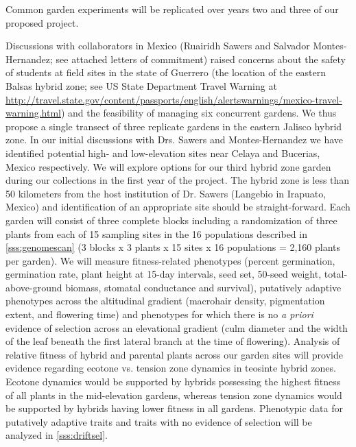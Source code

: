 Common garden experiments will be replicated over years two and three of our proposed project.  

Discussions with collaborators in Mexico (Ruairidh Sawers and Salvador Montes-Hernandez; see attached letters of commitment) raised concerns about the safety of students at field sites in the state of Guerrero (the location of the eastern Balsas hybrid zone; see US State Department Travel Warning at \url{http://travel.state.gov/content/passports/english/alertswarnings/mexico-travel-warning.html}) and the feasibility of managing six concurrent gardens. We thus propose a single transect of three replicate gardens in the eastern Jalisco hybrid zone. 
In our initial discussions with Drs. Sawers and Montes-Hernandez we have identified potential high- and low-elevation sites near Celaya and Bucerias, Mexico respectively.  
We will explore options for our third hybrid zone garden during our collections in the first year of the project.
The hybrid zone is less than 50 kilometers from the host institution of Dr. Sawers (Langebio in Irapuato, Mexico) and identification of an appropriate site should be straight-forward.
Each garden will consist of three complete blocks including a randomization of three plants from each of 15 sampling sites in the 16 populations described in \ref{sss:genomescan} (3 blocks x 3 plants x 15 sites x 16 populations = 2,160 plants per garden).  
We will measure fitness-related phenotypes (percent germination, germination rate, plant height at 15-day intervals, seed set, 50-seed weight, total-above-ground biomass, stomatal conductance and survival), putatively adaptive phenotypes across the altitudinal gradient (macrohair density, pigmentation extent, and flowering time) and phenotypes for which there is no \emph{a priori} evidence of selection across an elevational gradient (culm diameter  and the width of the leaf beneath the first lateral branch at the time of flowering).  
Analysis of relative fitness of hybrid and parental plants across our garden sites will provide evidence regarding ecotone vs. tension zone dynamics in teosinte hybrid zones.  Ecotone dynamics would be supported by hybrids possessing the highest fitness of all plants in the mid-elevation gardens, whereas tension zone dynamics would be supported by hybrids having lower fitness in all gardens.  Phenotypic data for putatively adaptive traits and traits with no evidence of selection will be analyzed in \ref{sss:driftsel}.   

